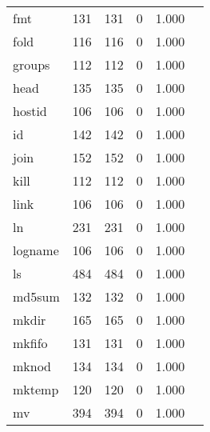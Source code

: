 \begin{longtable}{lp{2.40cm}p{2.40cm}p{2.40cm}p{2.40cm}p{2.40cm}}
fmt       &                     131 &              131 &                 0 &                        1.000 \\
fold      &                     116 &              116 &                 0 &                        1.000 \\
groups    &                     112 &              112 &                 0 &                        1.000 \\
head      &                     135 &              135 &                 0 &                        1.000 \\
hostid    &                     106 &              106 &                 0 &                        1.000 \\
id        &                     142 &              142 &                 0 &                        1.000 \\
join      &                     152 &              152 &                 0 &                        1.000 \\
kill      &                     112 &              112 &                 0 &                        1.000 \\
link      &                     106 &              106 &                 0 &                        1.000 \\
ln        &                     231 &              231 &                 0 &                        1.000 \\
logname   &                     106 &              106 &                 0 &                        1.000 \\
ls        &                     484 &              484 &                 0 &                        1.000 \\
md5sum    &                     132 &              132 &                 0 &                        1.000 \\
mkdir     &                     165 &              165 &                 0 &                        1.000 \\
mkfifo    &                     131 &              131 &                 0 &                        1.000 \\
mknod     &                     134 &              134 &                 0 &                        1.000 \\
mktemp    &                     120 &              120 &                 0 &                        1.000 \\
mv        &                     394 &              394 &                 0 &                        1.000 \\

\end{longtable}
